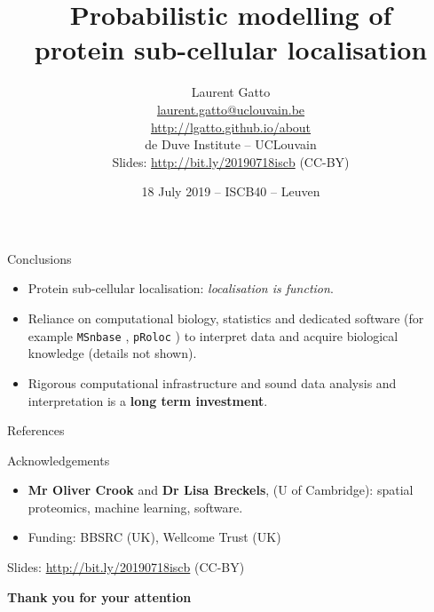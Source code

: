 \documentclass[presentation]{beamer}
\date{18 July 2019 -- ISCB40 -- Leuven}
\title{Probabilistic modelling of \\ protein sub-cellular localisation}
\author{Laurent Gatto\\
  \url{laurent.gatto@uclouvain.be}\\
  \url{http://lgatto.github.io/about}\\
  de Duve Institute -- UCLouvain\\
  \bigskip
  Slides: \url{http://bit.ly/20190718iscb}  (CC-BY)
}
\begin{document}
\maketitle





\begin{frame}[fragile]{Conclusions}
  \begin{itemize}
  \item Protein sub-cellular localisation: \textit{localisation is
    function}.

  \item Reliance on computational biology, statistics and dedicated
    software (for example \texttt{MSnbase} \citep{Gatto:2012},
    \texttt{pRoloc} \citep{Gatto:2014}) to interpret data and acquire
    biological knowledge (details not shown).

  \item Rigorous computational infrastructure 
    and sound data analysis and interpretation is a \textbf{long term
      investment}.

  \end{itemize}

\end{frame}


\begin{frame}[allowframebreaks]{References}
  \scriptsize
  
  
\end{frame}


\begin{frame}
  \begin{block}{Acknowledgements}
    \begin{itemize}
    \item \textbf{Mr Oliver Crook} and \textbf{Dr Lisa Breckels}, (U
      of Cambridge): spatial proteomics, machine learning, software.
    \item Funding: BBSRC (UK), Wellcome Trust (UK)
    \end{itemize}
  \end{block}

  \bigskip
  Slides: \url{http://bit.ly/20190718iscb} (CC-BY)
  \bigskip


  \begin{center}
    \textbf{Thank you for your attention}
  \end{center}

\end{frame}
\end{document}
